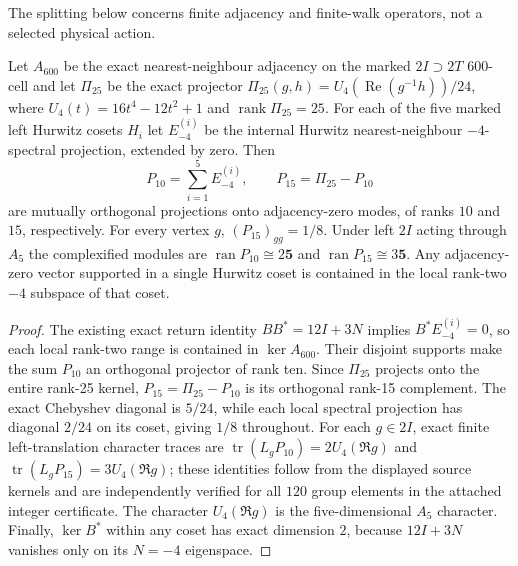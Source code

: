 \documentclass[11pt]{article}
\begin{document}
The splitting below concerns finite adjacency and finite-walk operators,
not a selected physical action.
\begin{theorem}
\label{p1b:thm:600-zero-split-collective15}
Let $A_{600}$ be the exact nearest-neighbour adjacency on the marked
$2I\supset2T$ 600-cell and let $\Pi_{25}$ be the exact projector
$\Pi_{25}(g,h)=U_4(\operatorname{Re}(g^{-1}h))/24$, where
$U_4(t)=16t^4-12t^2+1$ and $\operatorname{rank}\Pi_{25}=25$.
For each of the five marked left Hurwitz cosets $H_i$ let $E_{-4}^{(i)}$
be the internal Hurwitz nearest-neighbour $-4$-spectral projection,
extended by zero. Then
\[
P_{10}=\sum_{i=1}^5E_{-4}^{(i)},\qquad
P_{15}=\Pi_{25}-P_{10}
\]
are mutually orthogonal projections onto adjacency-zero modes, of
ranks $10$ and $15$, respectively. For every vertex $g$,
$(P_{15})_{gg}=1/8$. Under left $2I$ acting through $A_5$ the
complexified modules are $\operatorname{ran}P_{10}\cong2\mathbf5$
and $\operatorname{ran}P_{15}\cong3\mathbf5$.
Any adjacency-zero vector supported in a single Hurwitz coset is
contained in the local rank-two $-4$ subspace of that coset.
\end{theorem}
\begin{proof}
The existing exact return identity $BB^*=12I+3N$ implies
$B^*E_{-4}^{(i)}=0$, so each local rank-two range is contained in
$\ker A_{600}$. Their disjoint supports make the sum $P_{10}$ an
orthogonal projector of rank ten. Since $\Pi_{25}$ projects onto the
entire rank-25 kernel, $P_{15}=\Pi_{25}-P_{10}$ is its orthogonal
rank-15 complement. The exact Chebyshev diagonal is $5/24$,
while each local spectral projection has diagonal $2/24$ on its
coset, giving $1/8$ throughout. For each $g\in2I$, exact finite
left-translation character traces are
$\operatorname{tr}(L_gP_{10})=2U_4(\Re g)$ and
$\operatorname{tr}(L_gP_{15})=3U_4(\Re g)$; these identities follow
from the displayed source kernels and are independently verified
for all $120$ group elements in the attached integer certificate.
The character $U_4(\Re g)$ is the five-dimensional $A_5$
character. Finally, $\ker B^*$ within any coset has exact dimension
$2$, because $12I+3N$ vanishes only on its $N=-4$ eigenspace.
\end{proof}
\end{document}
